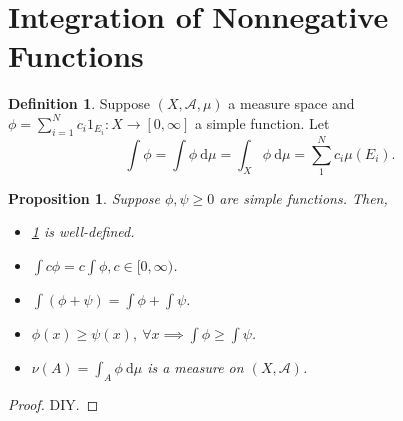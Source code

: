 \documentclass{report}
\newcommand{\cA}{\mathcal{A}}
\newcommand{\df}{\ \mathrm{d}}
\newtheorem{proposition}[theorem]{Proposition}
\theoremstyle{definition}
\newtheorem{definition}[theorem]{Definition}
\theoremstyle{remark}
\begin{document}
\section{Integration of Nonnegative Functions}
\begin{definition}\label{def:nonneg}
	Suppose $(X, \cA, \mu)$ a measure space and $\phi = \sum_{i=1}^N c_i1_{E_i}: X \to [0, \infty]$ a simple function.
	Let \[
		\int \phi = \int \phi \df\mu = \int_X \phi \df \mu = \sum_1^N c_i\mu(E_i).	
	\]
\end{definition}

\begin{proposition}
	Suppose $\phi, \psi \geq 0$ are simple functions. Then, 
	\begin{itemize}
		\item \ref{def:nonneg} is well-defined.
		\item $\displaystyle \int c\phi = c \int \phi, c \in [0, \infty)$.
		\item $\displaystyle \int (\phi + \psi) = \int \phi + \int \psi$.
		\item $\displaystyle \phi(x) \geq \psi(x),\ \forall x \implies \int \phi \geq \int \psi$.
		\item $\displaystyle \nu(A) = \int_A \phi \df \mu$ is a measure on $(X, \cA)$.
	\end{itemize}
\end{proposition}
\begin{proof}
	DIY.
\end{proof}
\end{document}
